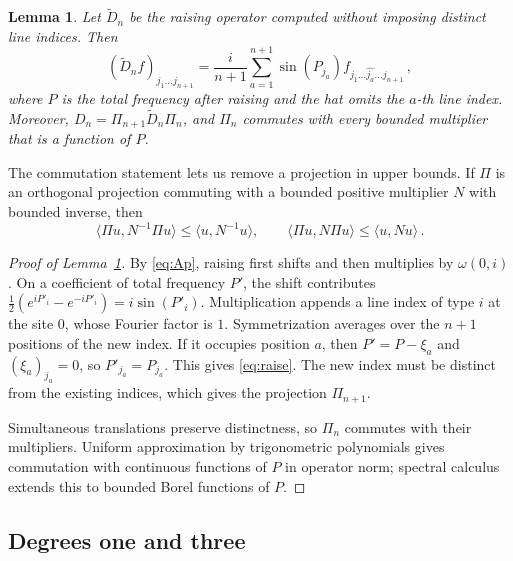 \documentclass[11pt]{amsart}
\theoremstyle{plain}
\newtheorem{lemma}[theorem]{Lemma}
\theoremstyle{definition}
\newcommand{\1}{\mathbf 1}
\newcommand{\ip}[2]{\langle #1,#2\rangle}
\begin{document}
	\begin{lemma}\label{lem:raise}
		Let $\widetilde D_n$ be the raising operator computed without imposing
		distinct line indices.  Then
		\begin{equation}\label{eq:raise}
			(\widetilde D_nf)_{j_1\dots j_{n+1}}
			=\frac i{n+1}\sum_{a=1}^{n+1}\sin(P_{j_a})
			f_{j_1\dots\widehat{j_a}\dots j_{n+1}}\, ,
		\end{equation}
		where $P$ is the total frequency after raising and the hat omits the
		$a$-th line index.  Moreover,
		$D_n=\Pi_{n+1}\widetilde D_n\Pi_n$, and $\Pi_n$ commutes with every bounded
		multiplier that is a function of $P$.
	\end{lemma}
	
	The commutation statement lets us remove a projection in upper bounds.
	If $\Pi$ is an orthogonal projection commuting with a bounded positive
	multiplier $N$ with bounded inverse, then
	\begin{equation}\label{eq:contract}
		\ip{\Pi u}{N^{-1}\Pi u}\leq\ip u{N^{-1}u},\qquad
		\ip{\Pi u}{N\Pi u}\leq\ip u{Nu}\, .
	\end{equation}
	
	\begin{proof}[Proof of Lemma~\ref{lem:raise}]
		By \eqref{eq:Ap}, raising first shifts and then multiplies by
		$\omega(0,i)$.  On a coefficient of total frequency $P'$, the shift
		contributes
		$\tfrac12(e^{iP'_i}-e^{-iP'_i})=i\sin(P'_i)$.  Multiplication appends a line
		index of type $i$ at the site $0$, whose Fourier factor is $1$.
		Symmetrization averages over the $n+1$ positions of the new index.  If it
		occupies position $a$, then $P'=P-\xi_a$ and $(\xi_a)_{j_a}=0$, so
		$P'_{j_a}=P_{j_a}$.  This gives \eqref{eq:raise}.  The new index must be
		distinct from the existing indices, which gives the projection $\Pi_{n+1}$.
		
		Simultaneous translations preserve distinctness, so $\Pi_n$ commutes
		with their multipliers.  Uniform approximation by trigonometric polynomials
		gives commutation with continuous functions of $P$ in operator norm;
		spectral calculus extends this to bounded Borel functions of $P$.
	\end{proof}
	
	\subsection{Degrees one and three}\label{ssec:degrees-one-three}\label{ssec:low-coordinates}
	
\end{document}
